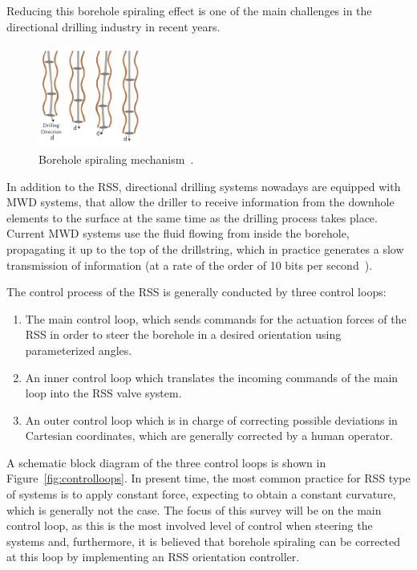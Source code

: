 Reducing this borehole spiraling effect is one of the main challenges in the directional drilling industry in recent years.

\begin{figure}[ht]\centering
	\includegraphics[width=0.3\textwidth]{img/boreholespiraling.pdf}
	\caption{\label{fig:boreholespiraling}Borehole spiraling mechanism~\cite{Marck2013}.}
\end{figure}

In addition to the \acs{RSS}, directional drilling systems nowadays are equipped with \acf{MWD} systems, that allow the driller to receive information from the downhole elements to the surface at the same time as the drilling process takes place. Current MWD systems use the fluid flowing from inside the borehole, propagating it up to the top of the drillstring, which in practice generates a slow transmission of information (at a rate of the order of 10 bits per second~\cite{Perneder2013}). 

The control process of the \acs{RSS} is generally conducted by three control loops:

\begin{enumerate}
	\item The main control loop, which sends commands for the actuation forces of the \acs{RSS} in order to steer the borehole in a desired orientation using parameterized angles.
	\item An inner control loop which translates the incoming commands of the main loop into the \acs{RSS} valve system.
	\item An outer control loop which is in charge of correcting possible deviations in Cartesian coordinates, which are generally corrected by a human operator. 
\end{enumerate}

A schematic block diagram of the three control loops is shown in Figure~\ref{fig:controlloops}. In present time, the most common practice  for \acs{RSS} type of systems is to apply constant force, expecting to obtain a constant curvature, which is generally not the case. The focus of this survey will be on the main control loop, as this is the most involved level of control when steering the systems and, furthermore, it is believed that borehole spiraling can be corrected at this loop by implementing an RSS orientation controller. 

